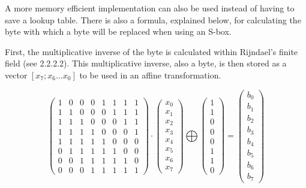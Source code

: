 \documentclass[12pt]{report}
\theoremstyle{definition}
\theoremstyle{remark}
\begin{document}
A more memory efficient implementation can also be used instead of having to save a lookup table. There is also a formula, explained below, for calculating the byte with which a byte will be replaced when using an S-box. 

First, the multiplicative inverse of the byte is calculated within Rijndael's finite field (see 2.2.2.2). This multiplicative inverse, also a byte, is then stored as a vector $[x_7; x_6 ... x_0]$ to be used in an affine transformation.

\[ \left( \begin{array}{cccccccc}
1 & 0 & 0 & 0 & 1 & 1 & 1 & 1 \\
1 & 1 & 0 & 0 & 0 & 1 & 1 & 1 \\
1 & 1 & 1 & 0 & 0 & 0 & 1 & 1 \\
1 & 1 & 1 & 1 & 0 & 0 & 0 & 1 \\
1 & 1 & 1 & 1 & 1 & 0 & 0 & 0 \\
0 & 1 & 1 & 1 & 1 & 1 & 0 & 0 \\
0 & 0 & 1 & 1 & 1 & 1 & 1 & 0 \\
0 & 0 & 0 & 1 & 1 & 1 & 1 & 1\end{array} \right)
\cdot
\left( \begin{array}{c}
x_0 \\
x_1 \\
x_2 \\
x_3 \\
x_4 \\
x_5 \\
x_6 \\
x_7\end{array} \right)
\bigoplus
\left( \begin{array}{c}
1 \\
1 \\
0 \\
0 \\
0 \\
1 \\
1 \\
0\end{array} \right)
=
\left( \begin{array}{c}
b_0 \\
b_1 \\
b_2 \\
b_3 \\
b_4 \\
b_5 \\
b_6 \\
b_7\end{array} \right)
\]
\end{document}

